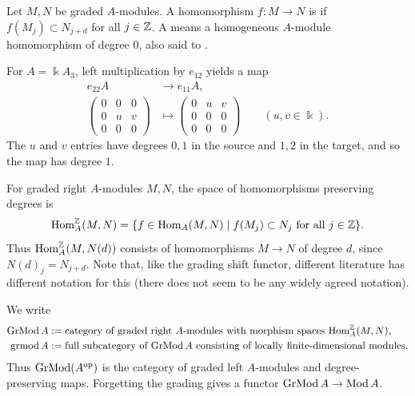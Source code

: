 \begin{definition}
Let $M,N$ be graded $A$-modules.
A homomorphism $f:M\to N$ is  if
$f(M_j)\subset N_{j+d}$ for all $j\in\mathbb{Z}$. A  means a homogeneous $A$-module homomorphism of degree $0$, also said to .
\end{definition}

\begin{example}\label{ex:matrix-hom}
For $A=\Bbbk A_3$, left multiplication by $e_{12}$ yields a map
\[
\begin{aligned}
e_{22}A&\longrightarrow e_{11}A,\\[-2pt]
\begin{pmatrix}0&0&0\\0&u&v\\0&0&0\end{pmatrix}
&\longmapsto
\begin{pmatrix}0&u&v\\0&0&0\\0&0&0\end{pmatrix}
\qquad(u,v\in\Bbbk).
\end{aligned}
\]
The $u$ and $v$ entries have degrees $0,1$ in the source and $1,2$ in the target, and so the map has degree $1$.
\end{example}

\begin{notation}\label{not:graded-hom}
For graded right $A$-modules $M,N$, the space of homomorphisms preserving degrees is
\begin{equation}\label{eq:graded-hom}
\operatorname{Hom}\nolimits_A^{\mathbb{Z}}(M,N)=\{f\in\operatorname{Hom}\nolimits_A(M,N)\mid f(M_j)\subset N_j\text{ for all }j\in\mathbb{Z}\}.
\end{equation}
Thus $\operatorname{Hom}\nolimits_A^{\mathbb{Z}}(M,N(d))$ consists of homomorphisms $M\to N$ of degree $d$, since $N(d)_j=N_{j+d}$.
Note that, like the grading shift functor, different literature has different notation for this (there does not seem to be any widely agreed notation).
\end{notation}

\label{not:graded-module-categories}
We write 
\begin{align*}
\operatorname{\mathrm{GrMod}} A &:= \text{category of graded right $A$-modules with morphism spaces $\operatorname{Hom}\nolimits_A^{\mathbb{Z}}(M,N)$},\\
\operatorname{\mathrm{grmod}} A &:= \text{full subcategory of $\operatorname{\mathrm{GrMod}} A$ consisting of locally finite-dimensional modules}.
\end{align*}
Thus $\operatorname{\mathrm{GrMod}}(A^{\mathrm{op}})$ is the category of graded left $A$-modules and degree-preserving maps.
Forgetting the grading gives a functor $\operatorname{\mathrm{GrMod}} A\to\operatorname{\mathrm{Mod}} A$.

